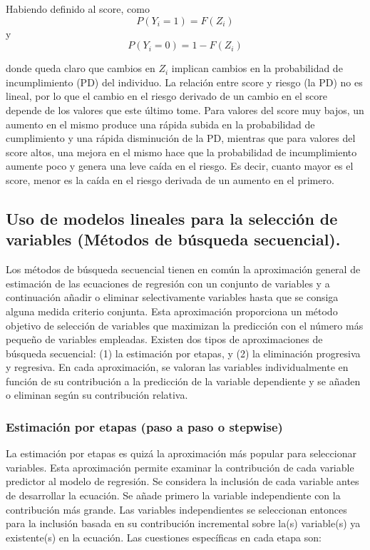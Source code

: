 \documentclass[
  12pt,
]{krantz}
\theoremstyle{definition}
\theoremstyle{definition}
\theoremstyle{definition}
\theoremstyle{remark}
\begin{document}
Habiendo definido al score, como \[P(Y_i=1)=F(Z_i)\] y \[P(Y_i=0)=1-F(Z_i)\]

donde queda claro que cambios en \(Z_i\) implican cambios en la probabilidad de incumplimiento (PD) del individuo. La relación entre score y riesgo (la PD) no es lineal, por lo que el cambio en el riesgo derivado de un cambio en el score depende de los valores que este último tome. Para valores del score muy bajos, un aumento en el mismo produce una rápida subida en la probabilidad de cumplimiento y una rápida disminución de la PD, mientras que para valores del score altos, una mejora en el mismo hace que la probabilidad de incumplimiento aumente poco y genera una leve caída en el riesgo. Es decir, cuanto mayor es el score, menor es la caída en el riesgo derivada de un aumento en el primero.

\hypertarget{uso-de-modelos-lineales-para-la-seleccion-de-variables-metodos-de-busqueda-secuencial.}{%
\subsection{Uso de modelos lineales para la selección de variables (Métodos de búsqueda secuencial).}\label{uso-de-modelos-lineales-para-la-seleccion-de-variables-metodos-de-busqueda-secuencial.}}

Los métodos de búsqueda secuencial tienen en común la aproximación general de estimación de las ecuaciones de regresión con un conjunto de variables y a continuación añadir o eliminar selectivamente variables hasta que se consiga alguna medida criterio conjunta. Esta aproximación proporciona un método objetivo de selección de variables que maximizan la predicción con el número más pequeño de variables empleadas. Existen dos tipos de aproximaciones de búsqueda secuencial: (1) la estimación por etapas, y (2) la eliminación progresiva y regresiva. En cada aproximación, se valoran las variables individualmente en función de su contribución a la predicción de la variable dependiente y se añaden o eliminan según su contribución relativa.

\hypertarget{estimacion-por-etapas-paso-a-paso-o-stepwise}{%
\subsubsection{Estimación por etapas (paso a paso o stepwise)}\label{estimacion-por-etapas-paso-a-paso-o-stepwise}}

La estimación por etapas es quizá la aproximación más popular para seleccionar variables. Esta aproximación permite examinar la contribución de cada variable predictor al modelo de regresión. Se considera la inclusión de cada variable antes de desarrollar la ecuación. Se añade primero la variable independiente con la contribución más grande. Las variables independientes se seleccionan entonces para la inclusión basada en su contribución incremental sobre la(s) variable(s) ya existente(s) en la ecuación. Las cuestiones específicas en cada etapa son:
\end{document}
